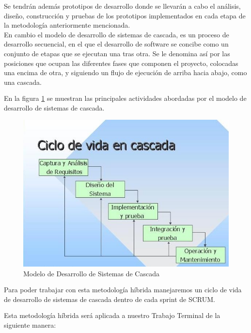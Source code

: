 Se tendrán además prototipos de desarrollo donde se llevarán a cabo el análisis, diseño, construcción y pruebas de los prototipos implementados en cada etapa de la metodología anteriormente mencionada.\\

En cambio el modelo de desarrollo de sistemas de cascada, es un proceso de desarrollo secuencial, en el que el desarrollo de software se concibe como  un conjunto de etapas que  se ejecutan una tras otra. Se le denomina así por las posiciones que ocupan las diferentes fases que componen el proyecto, colocadas una encima de otra, y siguiendo un flujo de ejecución de arriba hacia abajo, como una cascada.\cite{Referencia21}

En la figura \ref{fig:cascada} se muestran las principales actividades abordadas por el modelo de desarrollo de sistemas de cascada.
\newpage
\begin{figure}[htb]
	\centering
	\includegraphics[width=1\textwidth]{images/cap2/cascada}
	\caption{Modelo de Desarrollo de Sistemas de Cascada} \label{fig:cascada}
\end{figure}

Para poder trabajar con esta metodología híbrida manejaremos un ciclo de vida de desarrollo de sistemas de cascada dentro de cada sprint de SCRUM.

Esta metodología híbrida será aplicada a nuestro Trabajo Terminal de la siguiente manera:\\

